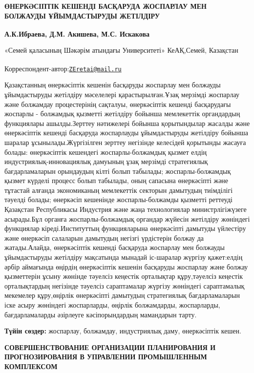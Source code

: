 


{\bfseries ӨНЕРКӘСІПТІК КЕШЕНДІ БАСҚАРУДА ЖОСПАРЛАУ МЕН БОЛЖАУДЫ
ҰЙЫМДАСТЫРУДЫ ЖЕТІЛДІРУ}

{\bfseries А.К.Ибраева\textsuperscript{\envelope }, Д.М. Акишева, М.С. Искакова}

«Семей қаласының Шәкәрім атындағы Университеті» КеАҚ,Семей, Казақстан

{\bfseries \textsuperscript{\envelope }}Корреспондент-автор:\href{mailto:ZEretai@mail.ru}{\nolinkurl{ZEretai@mail.ru}}

Қазақстанның өнеркәсіптік кешенін басқаруды жоспарлау мен болжауды
ұйымдастыруды жетілдіру мәселелері қарастырылған.Ұзақ мерзімді жоспарлау
және болжамдау процестерінің сақталуы, өнеркәсіптік кешенді басқарудағы
жоспарлы - болжамдық қызметті жетілдіру бойынша мемлекеттік органдардың
функциялары ашылды.Зерттеу нәтижелері бойынша қорытындылар жасалды және
өнеркәсіптік кешенді басқаруда жоспарлауды ұйымдастыруды жетілдіру
бойынша шаралар ұсынылады.Жүргізілген зерттеу негізінде келесідей
қорытынды жасауға болады: өнеркәсіптік кешендегі жоспарлы-болжамдық
қызмет елдің индустриялық-инновациялық дамуының ұзақ мерзімді
стратегиялық бағдарламаларын орындаудың кілті болып табылады;
жоспарлы-болжамдық қызмет күрделі процесс болып табылады, оның сапасына
өнеркәсіпті және тұтастай алғанда экономиканың мемлекеттік секторын
дамытудың тиімділігі тәуелді болады; өнеркәсіп кешенінде
жоспарлы-болжамды қызметті реттеуді Қазақстан Республикасы Индустрия
және жаңа технологиялар министрлігіжүзеге асырады.Бұл органға
жоспарлы-болжамдық органдар жүйесін жетілдіру жөніндегі функциялар
кіреді.Институттың функцияларына өнеркәсіпті дамытуды үйлестіру және
өнеркәсіп салаларын дамытудың негізгі үрдістерін болжау да
жатады.Алайда, өнеркәсіптік кешенді басқаруда жоспарлау мен болжауды
ұйымдастыруды жетілдіру мақсатында мынадай іс-шаралар жүргізу
қажет:елдің әрбір аймағында өңірдің өнеркәсіптік кешенін басқаруды
жоспарлау және болжау қызметтерін ұсыну жөнінде тәуелсіз кеңестік
орталықтар құру,тәуелсіз кеңестік орталықтардың негізінде тәуелсіз
сараптамалар жүргізу жөніндегі сараптамалық мекемелер құру,өңірлік
өнеркәсіпті дамытудың стратегиялық бағдарламаларын іске асыру жөніндегі
жоспарларды, өңірлік болжамдарды, жоспарларды, бағдарламаларды әзірлеуге
кәсіпорындардың мамандарын тарту.

{\bfseries Түйін сөздер:} жоспарлау, болжамдау, индустриялық даму,
өнеркәсіптік кешен.

{\bfseries СОВЕРШЕНСТВОВАНИЕ ОРГАНИЗАЦИИ ПЛАНИРОВАНИЯ И ПРОГНОЗИРОВАНИЯ В
УПРАВЛЕНИИ ПРОМЫШЛЕННЫМ КОМПЛЕКСОМ}

